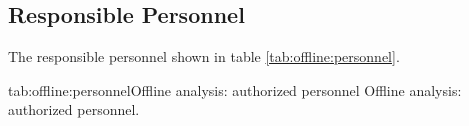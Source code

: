 \infolevfour {


%



} %

\begin{safetyen}{10}{15}
\subsection{Responsible  Personnel} 
\end{safetyen}
The responsible personnel shown in table \ref{tab:offline:personnel}.
\begin{namestab}{tab:offline:personnel}{Offline analysis: 
authorized personnel}{%
      Offline analysis: authorized personnel.}
  \RobertMichaels{}
  \AlexandreCamsonne{}
\end{namestab}
 
